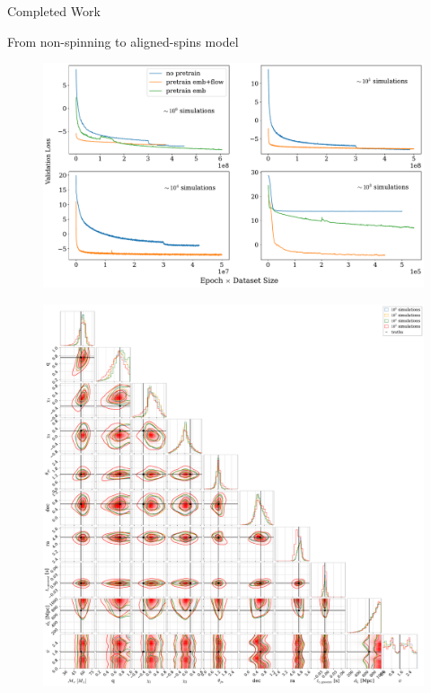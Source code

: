 \documentclass[a4paper, 12pt, twoside, openright, titlepage]{book}
\begin{document}
\begin{chapter}{Completed Work}
\begin{section}{From non-spinning to aligned-spins model}
\begin{figure}
\includegraphics[width=1.\columnwidth]{figures/val_loss.pdf}
\caption{}
\label{loss}
\end{figure}

\begin{figure}
\includegraphics[width=1.2\columnwidth]{figures/cornerplots.pdf}
\caption{}
\label{cp}
\end{figure}


\end{section}
\end{chapter}
\end{document}
